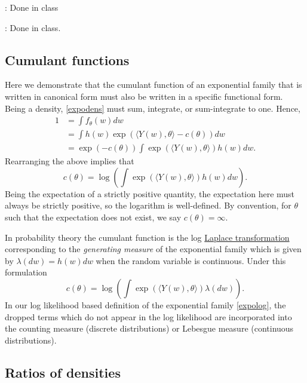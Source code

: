 \documentclass[
]{article}
\begin{document}
\vspace{0.5cm}

: Done in class

\vspace{0.5cm}

: Done in class.

\hypertarget{cumulant-functions}{%
\subsection{Cumulant functions}\label{cumulant-functions}}

Here we demonstrate that the cumulant function of an exponential family
that is written in canonical form must also be written in a specific
functional form. Being a density, \eqref{expodens} must sum, integrate,
or sum-integrate to one. Hence, \begin{align*}
    1 &= \int f_\theta(w) dw \\ 
      &= \int h(w)\exp\left(\langle Y(w),\theta \rangle - c(\theta)\right) dw \\
      &= \exp\left(-c(\theta)\right) \int \exp\left(\langle Y(w),\theta \rangle\right) h(w) dw.
\end{align*} Rearranging the above implies that \[
  c(\theta) = \log\left(\int \exp\left(\langle Y(w),\theta \rangle\right) h(w) dw\right).
\] Being the expectation of a strictly positive quantity, the
expectation here must always be strictly positive, so the logarithm is
well-defined. By convention, for \(\theta\) such that the expectation
does not exist, we say \(c(\theta) = \infty\).

In probability theory the cumulant function is the log
\href{https://en.wikipedia.org/wiki/Laplace_transform}{Laplace
transformation} corresponding to the \emph{generating measure} of the
exponential family which is given by \(\lambda(dw) = h(w)dw\) when the
random variable is continuous. Under this formulation \[
  c(\theta) = \log\left(\int \exp\left(\langle Y(w),\theta \rangle\right) \lambda(dw)\right).
\] In our log likelihood based definition of the exponential family
\eqref{expolog}, the dropped terms which do not appear in the log
likelihood are incorporated into the counting measure (discrete
distributions) or Lebesgue measure (continuous distributions).

\hypertarget{ratios-of-densities}{%
\subsection{Ratios of densities}\label{ratios-of-densities}}
\end{document}

